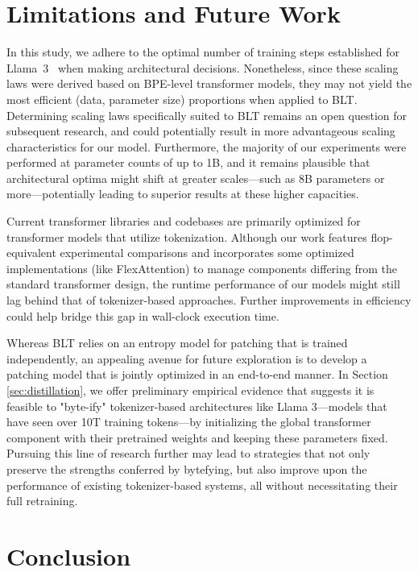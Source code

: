 \section{Limitations and Future Work}

In this study, we adhere to the optimal number of training steps established for Llama~3~\citep{dubey2024llama} when making architectural decisions. Nonetheless, since these scaling laws were derived based on BPE-level transformer models, they may not yield the most efficient (data, parameter size) proportions when applied to {\textsc BLT}. Determining scaling laws specifically suited to {\textsc BLT} remains an open question for subsequent research, and could potentially result in more advantageous scaling characteristics for our model. Furthermore, the majority of our experiments were performed at parameter counts of up to 1B, and it remains plausible that architectural optima might shift at greater scales—such as 8B parameters or more—potentially leading to superior results at these higher capacities.

Current transformer libraries and codebases are primarily optimized for transformer models that utilize tokenization. Although our work features flop-equivalent experimental comparisons and incorporates some optimized implementations (like FlexAttention) to manage components differing from the standard transformer design, the runtime performance of our models might still lag behind that of tokenizer-based approaches. Further improvements in efficiency could help bridge this gap in wall-clock execution time.

Whereas {\textsc BLT} relies on an entropy model for patching that is trained independently, an appealing avenue for future exploration is to develop a patching model that is jointly optimized in an end-to-end manner. In Section \ref{sec:distillation}, we offer preliminary empirical evidence that suggests it is feasible to "byte-ify" tokenizer-based architectures like Llama 3—models that have seen over 10T training tokens—by initializing the global transformer component with their pretrained weights and keeping these parameters fixed. Pursuing this line of research further may lead to strategies that not only preserve the strengths conferred by bytefying, but also improve upon the performance of existing tokenizer-based systems, all without necessitating their full retraining.

\section{Conclusion}
\label{section:conclusion}

